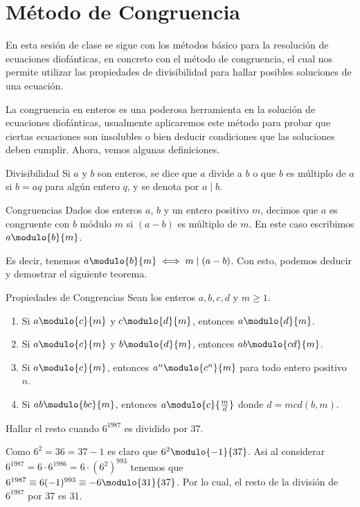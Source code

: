 \section{Método de Congruencia}

En esta sesión de clase se sigue con los métodos básico para la resolución de ecuaciones diofánticas, en concreto con
el método de congruencia, el cual nos permite utilizar las propiedades de divisibilidad para hallar posibles soluciones de una ecuación.

La congruencia en enteros es una poderosa herramienta en la solución de ecuaciones diofánticas, usualmente aplicaremos
este método para probar que ciertas ecuaciones son insolubles o bien deducir condiciones que las soluciones deben cumplir.
Ahora, vemos algunas definiciones.

\begin{definition.box}{Divisibilidad}{}
    Si $a$ y $b$ son enteros, se dice que $a$ divide a $b$ o que $b$ es múltiplo de $a$ si $b = aq$ para algún entero $q$,
    y se denota por $a \mid b$.
\end{definition.box}

\begin{definition.box}{Congruencias}{}
    Dados dos enteros $a$, $b$ y un entero positivo $m$, decimos que $a$ es congruente con $b$ módulo $m$ si $(a - b)$ es múltiplo de $m$.
    En este caso escribimos $a \modulo{b}{m}$.
\end{definition.box}
Es decir, tenemos $a \modulo{b}{m} \iff m \mid (a - b)$.
Con esto, podemos deducir y demostrar el siguiente teorema.

\begin{theorem.box}{Propiedades de Congrencias}{}
    Sean los enteros $a,b,c,d$ y $m \geq 1$.
    \begin{enumerate}
        \item Si $a \modulo{c}{m}$ y $c \modulo{d}{m}$, entonces $a \modulo{d}{m}$.
        \item Si $a \modulo{c}{m}$ y $b \modulo{d}{m}$, entonces $ab \modulo{cd}{m}$.
        \item Si $a \modulo{c}{m}$, entonces $a^n \modulo{c^n}{m}$ para todo entero positivo $n$.
        \item Si $ab \modulo{bc}{m}$, entonces $a \modulo{c}{\frac{m}{d}}$ donde $d = mcd(b,m)$.
    \end{enumerate}
\end{theorem.box}

\begin{example}
    Hallar el resto cuando $6^{1987}$ es dividido por 37.
\end{example}
\begin{solution}
    Como $6^2 = 36 = 37 - 1$ es claro que $6^2 \modulo{-1}{37}$.
    Asi al considerar $6^{1987} = 6\cdot 6^{1986} = 6\cdot (6^2)^{993}$ tenemos que $6^{1987} \equiv 6(-1)^{993} \equiv -6 \modulo{31}{37}$.
    Por lo cual, el resto de la división de $6^{1987}$ por 37 es 31.
\end{solution}

